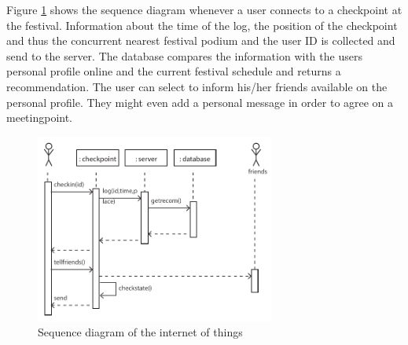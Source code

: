 Figure \ref{fig:sequenceinternet} shows the sequence diagram whenever a user connects to a checkpoint at the festival. Information about the time of the log, the position of the checkpoint and thus the concurrent nearest festival podium and the user ID is collected and send to the server. The database compares the information with the users personal profile online and the current festival schedule and returns a recommendation. The user can select to inform his/her friends available on the personal profile. They might even add a personal message in order to agree on a meetingpoint. 

\begin{figure}[h!]
\centering
\includegraphics[width=0.7\textwidth]{sequenceinternet.pdf}
\caption{Sequence diagram of the internet of things}
\label{fig:sequenceinternet}
\end{figure}

